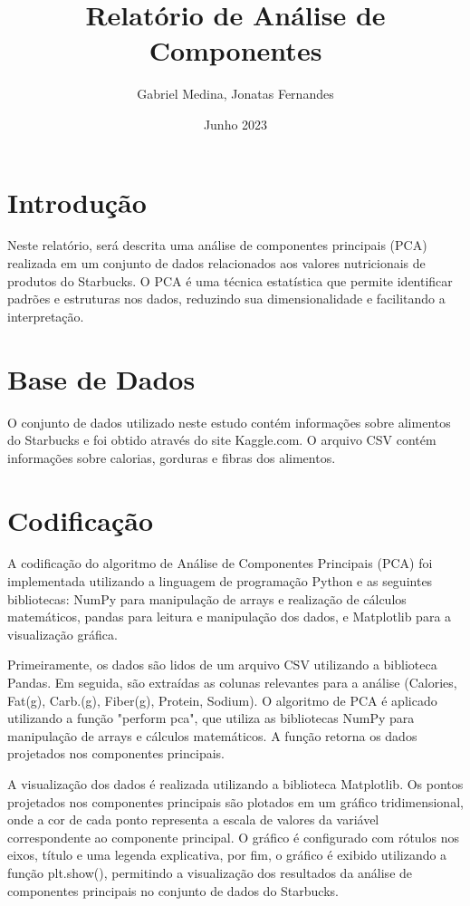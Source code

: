 \documentclass[12pt,a4]{article}
\title{Relatório de Análise de Componentes}
\author{Gabriel Medina, Jonatas Fernandes}
\date{Junho 2023}
\begin{document}
\maketitle
\section{Introdução}
Neste relatório, será descrita uma análise de componentes principais (PCA) realizada em um conjunto de dados relacionados aos valores nutricionais de produtos do Starbucks. O PCA é uma técnica estatística que permite identificar padrões e estruturas nos dados, reduzindo sua dimensionalidade e facilitando a interpretação.
\section{Base de Dados}
O conjunto de dados utilizado neste estudo contém informações sobre alimentos do Starbucks e foi obtido através do site Kaggle.com. O arquivo CSV contém informações sobre calorias, gorduras e fibras dos alimentos.
\section{Codificação}
A codificação do algoritmo de Análise de Componentes Principais (PCA) foi implementada utilizando a linguagem de programação Python e as seguintes bibliotecas: NumPy para manipulação de arrays e realização de cálculos matemáticos, pandas para leitura e manipulação dos dados, e Matplotlib para a visualização gráfica.
\begin{flushleft}
Primeiramente, os dados são lidos de um arquivo CSV utilizando a biblioteca Pandas. Em seguida, são extraídas as colunas relevantes para a análise (Calories, Fat(g), Carb.(g), Fiber(g), Protein, Sodium). O algoritmo de PCA é aplicado utilizando a função "perform pca", que utiliza as bibliotecas NumPy para manipulação de arrays e cálculos matemáticos. A função retorna os dados projetados nos componentes principais.
\end{flushleft}
\begin{flushleft}
A visualização dos dados é realizada utilizando a biblioteca Matplotlib. Os pontos projetados nos componentes principais são plotados em um gráfico tridimensional, onde a cor de cada ponto representa a escala de valores da variável correspondente ao componente principal. O gráfico é configurado com rótulos nos eixos, título e uma legenda explicativa, por fim, o gráfico é exibido utilizando a função plt.show(), permitindo a visualização dos resultados da análise de componentes principais no conjunto de dados do Starbucks.
\end{flushleft}
\newpage
\end{document}
